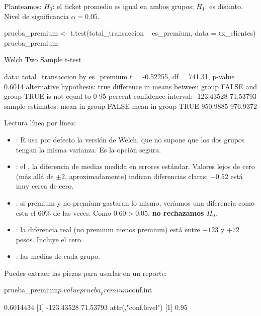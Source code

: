 Planteamos: $H_0$: el ticket promedio es igual en ambos grupos;
$H_1$: es distinto. Nivel de significancia $\alpha = 0.05$.

\begin{rcode}
prueba_premium <- t.test(total_transaccion ~ es_premium,
                         data = tx_clientes)
prueba_premium
\end{rcode}
\begin{rsalida}
        Welch Two Sample t-test

data:  total_transaccion by es_premium
t = -0.52255, df = 741.31, p-value = 0.6014
alternative hypothesis: true difference in means between group FALSE and group TRUE is not equal to 0
95 percent confidence interval:
 -123.43528   71.53793
sample estimates:
mean in group FALSE  mean in group TRUE
           950.9885            976.9372
\end{rsalida}

Lectura línea por línea:
\begin{itemize}
  \item {}: R usa por defecto la versión de
        Welch, que no supone que los dos grupos tengan la misma varianza. Es
        la opción segura.
  \item {}: el , la diferencia de
        medias medida en errores estándar. Valores lejos de cero (más allá de
        $\pm 2$, aproximadamente) indican diferencias claras; $-0.52$ está
        muy cerca de cero.
  \item {}: si premium y no premium gastaran lo mismo,
        veríamos una diferencia como esta el 60\% de las veces. Como
        $0.60 > 0.05$, \textbf{no rechazamos $H_0$}.
  \item {}: la diferencia real
        (no premium menos premium) está entre $-123$ y $+72$ pesos. Incluye
        el cero.
  \item {}: las medias de cada grupo.
\end{itemize}

Puedes extraer las piezas para usarlas en un reporte:

\begin{rcode}
prueba_premium$p.value
prueba_premium$conf.int
\end{rcode}
\begin{rsalida}
[1] 0.6014434
[1] -123.43528   71.53793
attr(,"conf.level")
[1] 0.95
\end{rsalida}

